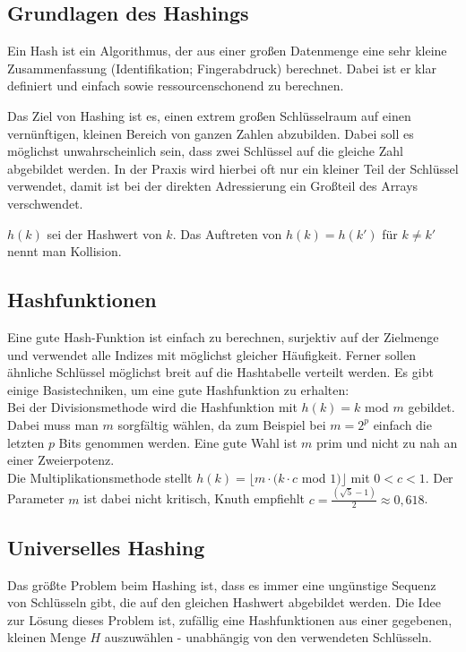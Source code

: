 \documentclass[12pt]{article}
\begin{document}
\subsection{Grundlagen des Hashings}

Ein Hash ist ein Algorithmus, der aus einer großen Datenmenge eine sehr kleine Zusammenfassung (Identifikation; Fingerabdruck) berechnet. Dabei ist er klar definiert und einfach sowie ressourcenschonend zu berechnen.

Das Ziel von Hashing ist es, einen extrem großen Schlüsselraum auf einen vernünftigen, kleinen Bereich von ganzen Zahlen abzubilden. Dabei soll es möglichst unwahrscheinlich sein, dass zwei Schlüssel auf die gleiche Zahl abgebildet werden. In der Praxis wird hierbei oft nur ein kleiner Teil der Schlüssel verwendet, damit ist bei der direkten Adressierung ein Großteil des Arrays verschwendet.

$h(k)$ sei der Hashwert von $k$. Das Auftreten von $h(k) = h(k')$ für $k \neq k'$ nennt man Kollision.

\subsection{Hashfunktionen}

Eine gute Hash-Funktion ist einfach zu berechnen, surjektiv auf der Zielmenge und verwendet alle Indizes mit möglichst gleicher Häufigkeit. Ferner sollen ähnliche Schlüssel möglichst breit auf die Hashtabelle verteilt werden. Es gibt einige Basistechniken, um eine gute Hashfunktion zu erhalten:\\

Bei der Divisionsmethode wird die Hashfunktion mit $h(k) = k$ mod $m$ gebildet. Dabei muss man $m$ sorgfältig wählen, da zum Beispiel bei $m = 2^p$ einfach die letzten $p$ Bits genommen werden. Eine gute Wahl ist $m$ prim und nicht zu nah an einer Zweierpotenz.\\

Die Multiplikationsmethode stellt $h(k) = \lfloor{}m \cdot{} (k \cdot{} c$ mod $1)\rfloor$ mit $0 < c < 1$. Der Parameter $m$ ist dabei nicht kritisch, Knuth empfiehlt $c = \frac{(\sqrt{5} - 1)}{2} \approx 0,618$.

\subsection{Universelles Hashing}

Das größte Problem beim Hashing ist, dass es immer eine ungünstige Sequenz von Schlüsseln gibt, die auf den gleichen Hashwert abgebildet werden. Die Idee zur Lösung dieses Problem ist, zufällig eine Hashfunktionen aus einer gegebenen, kleinen Menge $H$ auszuwählen - unabhängig von den verwendeten Schlüsseln.
\end{document}
